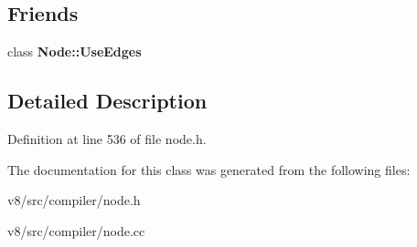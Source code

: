 \subsection*{Friends}
\begin{DoxyCompactItemize}
\item 
\mbox{\label{classv8_1_1internal_1_1compiler_1_1Node_1_1UseEdges_1_1iterator_a16acd692e95e6390e8fadbae7e0c88b8}} 
class {\bfseries Node\+::\+Use\+Edges}
\end{DoxyCompactItemize}


\subsection{Detailed Description}


Definition at line 536 of file node.\+h.



The documentation for this class was generated from the following files\+:\begin{DoxyCompactItemize}
\item 
v8/src/compiler/node.\+h\item 
v8/src/compiler/node.\+cc\end{DoxyCompactItemize}
